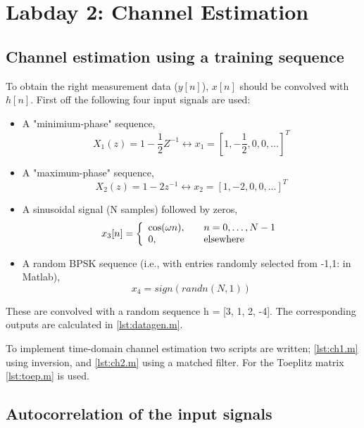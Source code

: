 \documentclass[final]{scrreprt} %
\begin{document}
\section{Labday 2: Channel Estimation}
\label{ch:labday2}

\subsection{Channel estimation using a training sequence}

To obtain the right measurement data ($y[n]$), $x[n]$ should be convolved with $h[n]$.
First off the following four input signals are used:

\begin{itemize}
\item 	A "minimium-phase" sequence, 
\begin{equation}
X_1(z) = 1 - \dfrac{1}{2}Z^{-1} \leftrightarrow x_1 = [1, -\dfrac{1}{2}, 0, 0,  \dots]^T
\end{equation}
\item A "maximum-phase" sequence,
\begin{equation}
X_2(z) = 1 - 2z^{-1} \leftrightarrow x_2 = [1, -2, 0, 0, \dots]^T
\end{equation}
\item A sinusoidal signal (N samples) followed by zeros,
\[ x_3[n] = \left\{ 
  \begin{array}{l l}
    \cos(\omega n), & \quad n = 0, \dots ,N - 1\\
    0, & \quad \textrm{elsewhere}
  \end{array} \right.\]
\item A random BPSK sequence (i.e., with entries randomly selected from {-1,1}: in Matlab),
\begin{equation}
x_4 = sign(randn(N,1))
\end{equation}
\end{itemize}

These are convolved with a random sequence h = [3, 1, 2, -4]. The corresponding outputs are calculated in \ref{lst:datagen.m}.

To implement time-domain channel estimation two scripts are written; \ref{lst:ch1.m} using inversion, and \ref{lst:ch2.m} using a matched filter.
For the Toeplitz matrix \ref{lst:toep.m} is used.

\subsection{Autocorrelation of the input signals}
\end{document}
